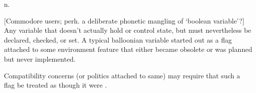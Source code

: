 n.

[Commodore users; perh. a deliberate phonetic mangling of `boolean variable'?]
Any variable that doesn't actually hold or control state, but must nevertheless
be declared, checked, or set. A typical balloonian variable started out as a
flag attached to some environment feature that either became obsolete or was
planned but never implemented.

Compatibility concerns (or politics attached to same) may require that such a
flag be treated as though it were .

